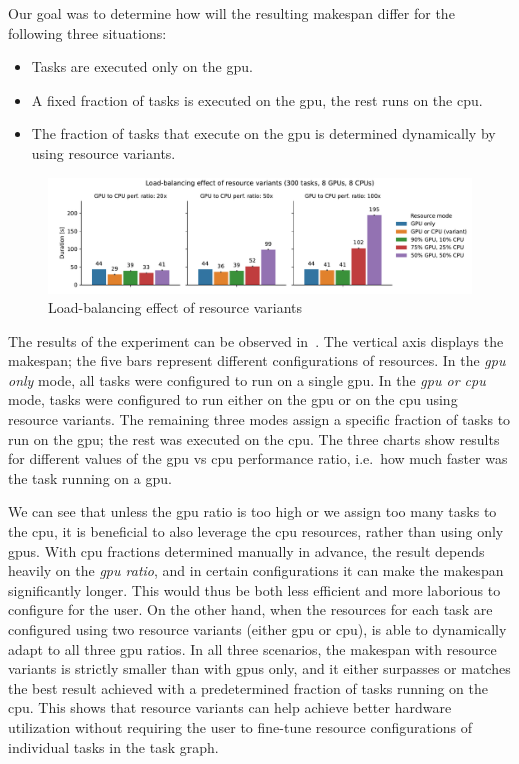 Our goal was to determine how will the resulting makespan differ for the following three
situations:
\begin{itemize}[itemsep=0pt]
	\item Tasks are executed only on the \gls{gpu}.
	\item A fixed fraction of tasks is executed on the \gls{gpu}, the rest runs on the
	      \gls{cpu}.
	\item The fraction of tasks that execute on the \gls{gpu} is determined dynamically by
	      \hyperqueue{} using resource variants.
\end{itemize}

\begin{figure}[h]
	\centering
	\includegraphics[width=\textwidth]{imgs/hq/charts/alternative-resources}
	\caption{Load-balancing effect of resource variants}
	\label{fig:hq-resource-variants}
\end{figure}

The results of the experiment can be observed in~. The vertical axis
displays the makespan; the five bars represent different configurations of resources. In the
\emph{\gls{gpu} only} mode, all tasks were configured to run on a single
\gls{gpu}. In the \emph{\gls{gpu} or \gls{cpu}} mode, tasks were configured to run either
on the \gls{gpu} or on the \gls{cpu} using resource variants. The
remaining three modes assign a specific fraction of tasks to run on the \gls{gpu};
the rest was executed on the \gls{cpu}. The three charts show results for different
values of the \gls{gpu} vs \gls{cpu} performance ratio, i.e.\ how much
faster was the task running on a \gls{gpu}.

We can see that unless the \gls{gpu} ratio is too high or we assign too many tasks to
the \gls{cpu}, it is beneficial to also leverage the \gls{cpu}
resources, rather than using only \glspl{gpu}. With \gls{cpu} fractions
determined manually in advance, the result depends heavily on the \emph{\gls{gpu} ratio}, and in
certain configurations it can make the makespan significantly longer. This would thus be both less
efficient and more laborious to configure for the user. On the other hand, when the resources for
each task are configured using two resource variants (either \gls{gpu} or
\gls{cpu}), \hyperqueue{} is able to dynamically adapt to all three
\gls{gpu} ratios. In all three scenarios, the makespan with resource variants is
strictly smaller than with \glspl{gpu} only, and it either surpasses or matches the
best result achieved with a predetermined fraction of tasks running on the \gls{cpu}.
This shows that resource variants can help achieve better hardware utilization without requiring
the user to fine-tune resource configurations of individual tasks in the task graph.


